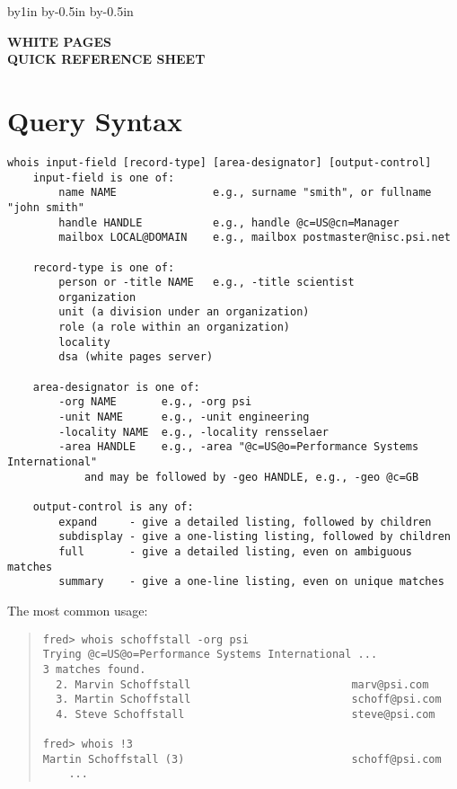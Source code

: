 



\advance\textwidth by1in
\advance\oddsidemargin by-0.5in
\advance\evensidemargin by-0.5in

\pagestyle{empty}



\begin{center}\LARGE\bf
WHITE PAGES\\ 
\large\bf QUICK REFERENCE SHEET
\end{center}

\section*	{Query Syntax}
\begin{verbatim}
whois input-field [record-type] [area-designator] [output-control]
    input-field is one of:
        name NAME               e.g., surname "smith", or fullname "john smith"
        handle HANDLE           e.g., handle @c=US@cn=Manager
        mailbox LOCAL@DOMAIN    e.g., mailbox postmaster@nisc.psi.net

    record-type is one of:
        person or -title NAME   e.g., -title scientist
        organization
        unit (a division under an organization)
        role (a role within an organization)
        locality
        dsa (white pages server)

    area-designator is one of:
        -org NAME       e.g., -org psi
        -unit NAME      e.g., -unit engineering
        -locality NAME  e.g., -locality rensselaer
        -area HANDLE    e.g., -area "@c=US@o=Performance Systems International"
            and may be followed by -geo HANDLE, e.g., -geo @c=GB

    output-control is any of:
        expand     - give a detailed listing, followed by children
        subdisplay - give a one-listing listing, followed by children
        full       - give a detailed listing, even on ambiguous matches
        summary    - give a one-line listing, even on unique matches
\end{verbatim}
\vfill\noindent
The most common usage:
\begin{quote}\small\begin{verbatim}
fred> whois schoffstall -org psi
Trying @c=US@o=Performance Systems International ...
3 matches found.
  2. Marvin Schoffstall                         marv@psi.com
  3. Martin Schoffstall                         schoff@psi.com
  4. Steve Schoffstall                          steve@psi.com

fred> whois !3
Martin Schoffstall (3)                          schoff@psi.com
    ...
\end{verbatim}\end{quote}

